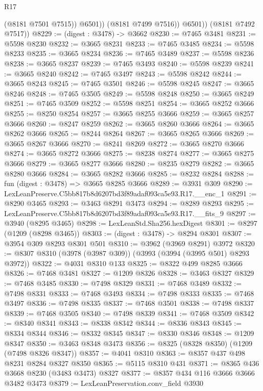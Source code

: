 \begin{lexlean}{R17}
\begin{coremodule}
                  (@8181 @7501 @7515))
                @6501))
            (@8181 @7499 @7516))
          @6501))
      (@8181 @7492 @7517))
@8229 := (digest : @3478) -> @3662
@8230 := @7465 @3481
@8231 := @5598 @8230
@8232 := @3665 @8231
@8233 := @7465 @3485
@8234 := @5598 @8233
@8235 := @3665 @8234
@8236 := @7465 @3489
@8237 := @5598 @8236
@8238 := @3665 @8237
@8239 := @7465 @3493
@8240 := @5598 @8239
@8241 := @3665 @8240
@8242 := @7465 @3497
@8243 := @5598 @8242
@8244 := @3665 @8243
@8245 := @7465 @3501
@8246 := @5598 @8245
@8247 := @3665 @8246
@8248 := @7465 @3505
@8249 := @5598 @8248
@8250 := @3665 @8249
@8251 := @7465 @3509
@8252 := @5598 @8251
@8254 := @3665 @8252 @3666
@8255 := @8250 @8254
@8257 := @3665 @8255 @3666
@8259 := @3665 @8257 @3666
@8260 := @8247 @8259
@8262 := @3665 @8260 @3666
@8264 := @3665 @8262 @3666
@8265 := @8244 @8264
@8267 := @3665 @8265 @3666
@8269 := @3665 @8267 @3666
@8270 := @8241 @8269
@8272 := @3665 @8270 @3666
@8274 := @3665 @8272 @3666
@8275 := @8238 @8274
@8277 := @3665 @8275 @3666
@8279 := @3665 @8277 @3666
@8280 := @8235 @8279
@8282 := @3665 @8280 @3666
@8284 := @3665 @8282 @3666
@8285 := @8232 @8284
@8288 := fun (digest : @3478) => @3665 @8285 @3666
@8289 := @3931 @309
@8290 := LexLeanPreserve.C5bb817b8d6207bd3f89adaf093ca5e93.R17.__enc_1
@8291 := @8290 @3465
@8293 := @3463 @8291 @3473
@8294 := @8289 @8293
@8295 := LexLeanPreserve.C5bb817b8d6207bd3f89adaf093ca5e93.R17.__fits_9
@8297 := @3940 (@8295 @3465)
@8298 := LexLeanStd.Sha256.hexDigest
@8301 := @8297 (@1209 (@8298 @3465))
@8303 := (digest : @3478) -> @8294 @8301
@8307 := @3954 @309 @8293 @8301 @501
@8310 := @3962 (@3969 @8291) @3972
@8320 := @8307 @8310 (@3978 (@3987 @309)) (@3993 (@3994 (@3995 @501) @8293 @3972))
@8322 := @4031 @8310 @133
@8325 := @8322 @499 @8285 @3666
@8326 := @7468 @3481
@8327 := @1209 @8326
@8328 := @3463 @8327
@8329 := @7468 @3485
@8330 := @7498 @8329
@8331 := @7468 @3489
@8332 := @7498 @8331
@8333 := @7468 @3493
@8334 := @7498 @8333
@8335 := @7468 @3497
@8336 := @7498 @8335
@8337 := @7468 @3501
@8338 := @7498 @8337
@8339 := @7468 @3505
@8340 := @7498 @8339
@8341 := @7468 @3509
@8342 := @8340 @8341
@8343 := @8338 @8342
@8344 := @8336 @8343
@8345 := @8334 @8344
@8346 := @8332 @8345
@8347 := @8330 @8346
@8348 := @1209 @8347
@8350 := @3463 @8348 @3473
@8356 := @8325 (@8328 @8350) (@1209 (@7498 @8326 @8347))
@8357 := @4041 @8310
@8363 := @8357 @437 @498 @8231 @8284 @8327 @8350
@8365 := @5115 @8310 @431
@8371 := @8365 @436 @3668 @8230 (@3483 @3473) @8327
@8377 := @8357 @434 @116 @3666 @3666 @3482 @3473
@8379 := LexLeanPreservation.conv_field @3930

\end{coremodule}
\end{lexlean}
